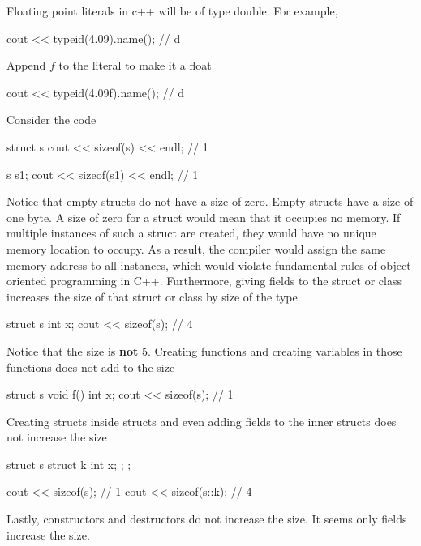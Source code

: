 \documentclass{report}
\begin{document}
    \pagebreak 
    \bigbreak \noindent 
    Floating point literals in c++ will be of type double. For example,
    \bigbreak \noindent 
    \begin{cppcode}
    cout << typeid(4.09).name(); // d
    \end{cppcode}
    \bigbreak \noindent 
    Append $f$ to the literal to make it a float
    \bigbreak \noindent 
    \begin{cppcode}
        cout << typeid(4.09f).name(); // d
    \end{cppcode}

    \pagebreak 
    \bigbreak \noindent 
    Consider the code
    \bigbreak \noindent 
    \begin{cppcode}
        struct s { }
        cout << sizeof(s) << endl; // 1

        s s1;
        cout << sizeof(s1) << endl; // 1
    \end{cppcode}
    \bigbreak \noindent 
    Notice that empty structs do not have a size of zero. Empty structs have a size of one byte. 
    \bigbreak \noindent 
    A size of zero for a struct would mean that it occupies no memory. If multiple instances of such a struct are created, they would have no unique memory location to occupy. As a result, the compiler would assign the same memory address to all instances, which would violate fundamental rules of object-oriented programming in C++.
    \bigbreak \noindent 
    Furthermore, giving fields to the struct or class increases the size of that struct or class by size of the type. 
    \bigbreak \noindent 
    \begin{cppcode}
        struct s { int x; }
        cout << sizeof(s); // 4
    \end{cppcode}
    \bigbreak \noindent 
    Notice that the size is \textbf{not} 5. Creating functions and creating variables in those functions does not add to the size
    \bigbreak \noindent 
    \begin{cppcode}
        struct s {
            void f()  {
                int  x;
            }
        }
        cout << sizeof(s); // 1
    \end{cppcode}
    \bigbreak \noindent 
    Creating structs inside structs and even adding fields to the inner structs does not increase the size
    \bigbreak \noindent 
    \begin{cppcode}
    struct s {
        struct k { int x; };
    };

    cout << sizeof(s); // 1
    cout << sizeof(s::k); // 4
    \end{cppcode}
    \bigbreak \noindent 
    Lastly, constructors and destructors do not increase the size.
    \bigbreak \noindent 
    It seems only fields increase the size.
\end{document}
